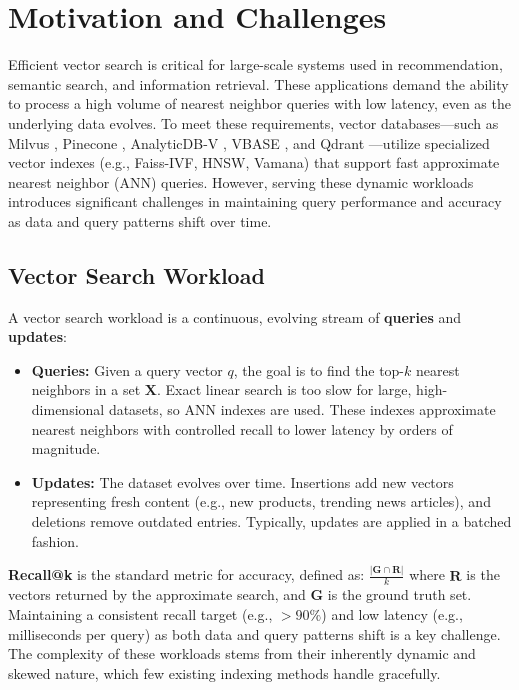 \section{Motivation and Challenges}
\label{sec:motivation}

Efficient vector search is critical for large-scale systems used in recommendation, semantic search, and information retrieval. These applications demand the ability to process a high volume of nearest neighbor queries with low latency, even as the underlying data evolves. To meet these requirements, vector databases—such as Milvus \cite{wang2021milvus}, Pinecone \cite{pinecone-url}, AnalyticDB-V \cite{wei2020analyticdb}, VBASE \cite{zhang2023vbase}, and Qdrant \cite{noauthor_qdrant_nodate}—utilize specialized vector indexes (e.g., Faiss-IVF, HNSW, Vamana) that support fast approximate nearest neighbor (ANN) queries. However, serving these dynamic workloads introduces significant challenges in maintaining query performance and accuracy as data and query patterns shift over time.


\subsection{Vector Search Workload}
A vector search workload is a continuous, evolving stream of \textbf{queries} and \textbf{updates}:
\begin{itemize}[leftmargin=*, itemsep=0pt, topsep=0pt]
    \item \textbf{Queries:} Given a query vector $q$, the goal is to find the top-$k$ nearest neighbors in a set $\mathbf{X}$. Exact linear search is too slow for large, high-dimensional datasets, so ANN indexes are used. These indexes approximate nearest neighbors with controlled recall to lower latency by orders of magnitude.
    \item \textbf{Updates:} The dataset evolves over time. Insertions add new vectors representing fresh content (e.g., new products, trending news articles), and deletions remove outdated entries. Typically, updates are applied in a batched fashion.
\end{itemize}

\textbf{Recall@k} is the standard metric for accuracy, defined as:
$\frac{|\mathbf{G} \cap \mathbf{R}|}{k}$ where \(\mathbf{R}\) is the vectors returned by the approximate search, and \(\mathbf{G}\) is the ground truth set. Maintaining a consistent recall target (e.g., $>90\%$) and low latency (e.g., milliseconds per query) as both data and query patterns shift is a key challenge. The complexity of these workloads stems from their inherently dynamic and skewed nature, which few existing indexing methods handle gracefully.

